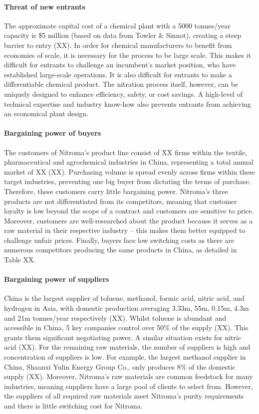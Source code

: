 \paragraph{Threat of new entrants}
The approximate capital cost of a chemical plant with a 5000 tonnes/year capacity is \$5 million (based on data from Towler \& Sinnot), creating a steep barrier to entry (XX). In order for chemical manufacturers to benefit from economies of scale, it is necessary for the process to be large scale. This makes it difficult for entrants to challenge an incumbent’s market position, who have established large-scale operations. It is also difficult for entrants to make a differentiable chemical product. The nitration process itself, however, can be uniquely designed to enhance efficiency, safety, or cost savings. A high-level of technical expertise and industry know-how also prevents entrants from achieving an economical plant design.  

\paragraph{Bargaining power of buyers}
The customers of Nitroma’s product line consist of XX firms within the textile, pharmaceutical and agrochemical industries in China, representing a total annual market of XX (XX). Purchasing volume is spread evenly across firms within these target industries, preventing one big buyer from dictating the terms of purchase. Therefore, these customers carry little bargaining power. Nitroma’s three products are not differentiated from its competitors, meaning that customer loyalty is low beyond the scope of a contract and customers are sensitive to price. Moreover, customers are well-researched about the product because it serves as a raw material in their respective industry – this makes them better equipped to challenge unfair prices. Finally, buyers face low switching costs as there are numerous competitors producing the same products in China, as detailed in Table XX.

\paragraph{Bargaining power of suppliers}
China is the largest supplier of toluene, methanol, formic acid, nitric acid, and hydrogen in Asia, with domestic production averaging 3.33m, 55m, 0.15m, 4.3m and 21m tonnes/year respectively (XX). Whilst toluene is abundant and accessible in China, 5 key companies control over 50\% of the supply (XX). This grants them significant negotiating power. A similar situation exists for nitric acid (XX). For the remaining raw materials, the number of suppliers is high and concentration of suppliers is low. For example, the largest methanol supplier in China, Shaanxi Yulin Energy Group Co., only produces 8\% of the domestic supply (XX). Moreover, Nitroma’s raw materials are common feedstock for many industries, meaning suppliers have a large pool of clients to select from. However, the suppliers of all required raw materials meet Nitroma’s purity requirements and there is little switching cost for Nitroma. 

